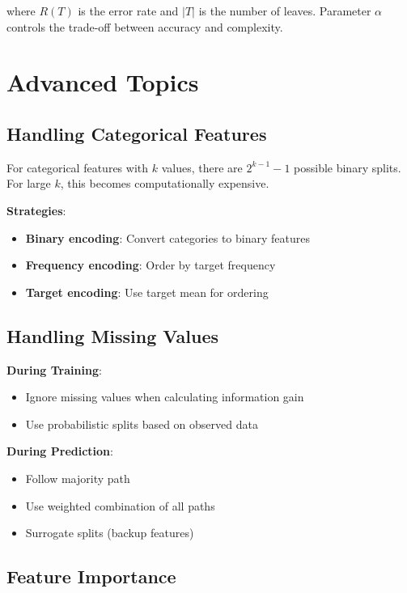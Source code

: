 \documentclass{article}
\begin{document}
where $R(T)$ is the error rate and $|T|$ is the number of leaves. Parameter $\alpha$ controls the trade-off between accuracy and complexity.

\section{Advanced Topics}

\subsection{Handling Categorical Features}

For categorical features with $k$ values, there are $2^{k-1} - 1$ possible binary splits. For large $k$, this becomes computationally expensive.

\textbf{Strategies}:
\begin{itemize}
    \item \textbf{Binary encoding}: Convert categories to binary features
    \item \textbf{Frequency encoding}: Order by target frequency
    \item \textbf{Target encoding}: Use target mean for ordering
\end{itemize}

\subsection{Handling Missing Values}

\textbf{During Training}:
\begin{itemize}
    \item Ignore missing values when calculating information gain
    \item Use probabilistic splits based on observed data
\end{itemize}

\textbf{During Prediction}:
\begin{itemize}
    \item Follow majority path
    \item Use weighted combination of all paths
    \item Surrogate splits (backup features)
\end{itemize}

\subsection{Feature Importance}
\end{document}
